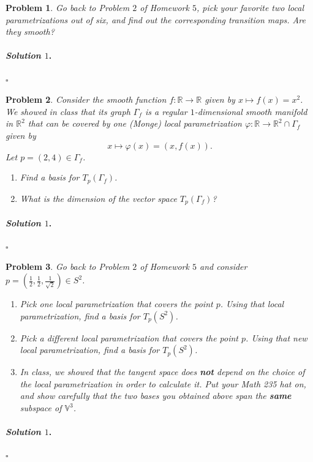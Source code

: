\documentclass[reqno]{amsart}
\theoremstyle{plain}
\newtheorem{problem}{Problem}
\theoremstyle{definition}
\newenvironment{solution1}{\paragraph{\emph{Solution $1$}.}}{\hfill$\square$}
\begin{document}
\begin{problem}
Go back to Problem $2$ of Homework $5$, pick your favorite two local parametrizations out of six, and find out the corresponding transition maps.  Are they smooth?
\end{problem}
\begin{solution1}

\end{solution1}



\begin{problem}
Consider the smooth function $f:\mathbb{R} \rightarrow \mathbb{R}$ given by $x \mapsto f(x) = x^{2}$.  We showed in class that its graph $\Gamma_{f}$ is a regular $1$-dimensional smooth manifold in $\mathbb{R}^{2}$ that can be covered by one (Monge) local parametrization $\varphi:\mathbb{R} \rightarrow \mathbb{R}^{2} \cap \Gamma_{f}$ given by
$$x \mapsto \varphi(x) = (x,f(x)). $$
Let $p = (2,4) \in \Gamma_{f}$.  
\begin{enumerate}
\item Find a basis for $T_{p}(\Gamma_{f})$.  
\item What is the dimension of the vector space $T_{p}(\Gamma_{f})$?
\end{enumerate}
\end{problem}
\begin{solution1}

\end{solution1}


\begin{problem}
Go back to Problem $2$ of Homework $5$ and consider $p = \left(\frac{1}{2},\frac{1}{2},\frac{1}{\sqrt{2}}\right) \in S^{2}$.
\begin{enumerate}
\item Pick one local parametrization that covers the point $p$.  Using that local parametrization, find a basis for $T_{p}(S^{2})$.
\item Pick a different local parametrization that covers the point $p$.  Using that new local parametrization, find a basis for $T_{p}(S^{2})$.
\item In class, we showed that the tangent space does {\bfseries not} depend on the choice of the local parametrization in order to calculate it.  Put your Math 235 hat on, and show carefully that the two bases you obtained above span the {\bfseries same} subspace of $\mathbb{V}^{3}$.
\end{enumerate}
\end{problem}
\begin{solution1}

\end{solution1}
\end{document}
